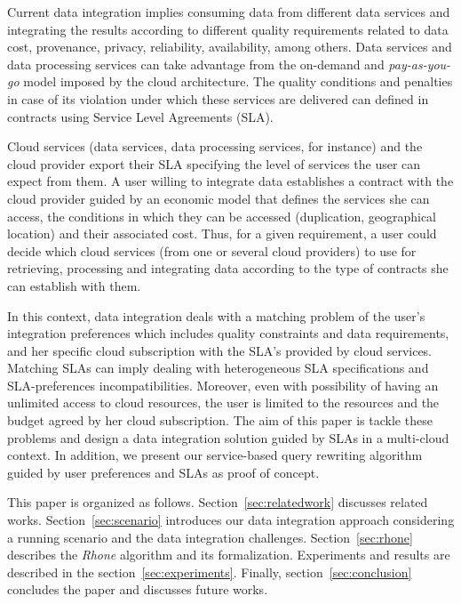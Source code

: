 Current data integration implies consuming data from different data services and
integrating the results according to different quality requirements related to
data cost, provenance, privacy, reliability, availability, among others. Data
services and data processing services can take advantage from the on-demand and
\textit{pay-as-you-go} model imposed by the cloud architecture. The quality
conditions and penalties in case of its violation under which these services are
delivered can defined in contracts using Service Level Agreements (SLA).        

Cloud services (data services, data processing services, for instance) and the
cloud provider export their SLA specifying the level of services the user can
expect from them. A user willing to integrate data establishes a contract with
the cloud provider guided by an economic model that defines the services she can
access, the conditions in which they can be accessed (duplication, geographical
location) and their associated cost. Thus, for a given requirement, a user could
decide which cloud services (from one or several cloud providers) to use for
retrieving, processing and integrating data according to the type of contracts
she can establish with them.         

In this context, data integration deals with a matching problem of the user's
integration preferences which includes quality constraints and data
requirements, and her specific cloud subscription with the SLA's provided by
cloud services. Matching SLAs can imply dealing with heterogeneous SLA
specifications and SLA-preferences incompatibilities. Moreover, even with
possibility of having an unlimited access to cloud resources, the user is
limited to the resources and the budget agreed by her cloud subscription. The
aim of this paper is tackle these problems and design a data integration
solution guided by SLAs in a multi-cloud context. In addition, we present our
service-based query rewriting algorithm guided by user preferences and  SLAs as
proof of concept.           

This paper is organized as follows. 
Section~\ref{sec:relatedwork} discusses related works.
Section~\ref{sec:scenario} introduces our data integration approach considering
a running scenario and the data integration challenges. 
Section~\ref{sec:rhone} describes the \textit{Rhone} algorithm and its formalization. Experiments and results are described in the section~\ref{sec:experiments}. 
Finally, section~\ref{sec:conclusion} concludes the paper and discusses future works.

